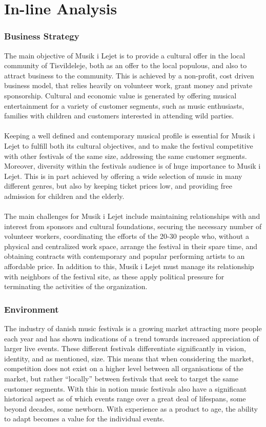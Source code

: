 \part{In-line Analysis}

\section{Business Strategy}
The main objective of Musik i Lejet is to provide a cultural offer in the local community of Tisvildeleje, both as an offer to the local populous, and also to attract business to the community. This is achieved by a non-profit, cost driven business model, that relies heavily on volunteer work, grant money and private sponsorship. Cultural and economic value is generated by offering musical entertainment for a variety of customer segments, such as music enthusiasts, families with children and customers interested in attending wild parties.
\\ \\
Keeping a well defined and contemporary musical profile is essential for Musik i Lejet to fulfill both its cultural objectives, and to make the festival competitive with other festivals of the same size, addressing the same customer segments. Moreover, diversity within the festivals audience is of huge importance to Musik i Lejet. This is in part achieved by offering a wide selection of music in many different genres, but also by keeping ticket prices low, and providing free admission for children and the elderly.
\\ \\
The main challenges for Musik i Lejet include maintaining relationships with and interest from sponsors and cultural foundations, securing the necessary number of volunteer workers, coordinating the efforts of the 20-30 people who, without a physical and centralized work space, arrange the festival in their spare time, and obtaining contracts with contemporary and popular performing artists to an affordable price. In addition to this, Musik i Lejet must manage its relationship with neighbors of the festival site, as these apply political pressure for terminating the activities of the organization.

\section{Environment}
The industry of danish music festivals is a growing market attracting more people each year and has shown indications of a trend towards increased appreciation of larger live events. These different festivals differentiate significantly in vision, identity, and as mentioned, size. This means that when considering the market, competition does not exist on a higher level between all organisations of the market, but rather “locally” between festivals that seek to target the same customer segments. With this in notion music festivals also have a significant historical aspect as of which events range over a great deal of lifespans, some beyond decades, some newborn. With experience as a product to age, the ability to adapt becomes a value for the individual events. 

